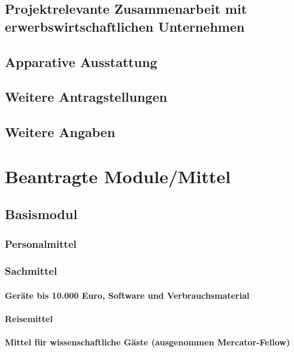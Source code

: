 \documentclass[de]{dfg-proposal}
\begin{document}
        \subsection{Projektrelevante Zusammenarbeit mit erwerbswirtschaftlichen Unternehmen}

        \subsection{Apparative Ausstattung}

        \subsection{Weitere Antragstellungen}

        \subsection{Weitere Angaben}


    \section{Beantragte Module/Mittel}\label{sec:beantragte-module/mittel}

        \subsection{Basismodul}

            \subsubsection{Personalmittel}

            \subsubsection{Sachmittel}

                \paragraph{Geräte bis 10.000 Euro, Software und Verbrauchsmaterial}

                \paragraph{Reisemittel}

                \paragraph{Mittel für wissenschaftliche Gäste (ausgenommen Mercator-Fellow)}
\end{document}
